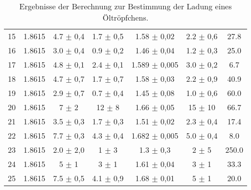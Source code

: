 \begin{landscape}
\begin{table}
\begin{center}
\begin{tabular}{c S[table-format=1.4] S[table-format=1.1] S[table-format=1.2] S[table-format=1.3] S[table-format=1.2] S[table-format=3.1]}
15  & 1.8615  & 4.7 $\pm$ 0,4  & 1.7  $\pm$ 0,5  & 1.58   $\pm$ 0,02  &  2.2 $\pm$   0,6  &   27.8\\
16  & 1.8615  & 3.0 $\pm$ 0,4  & 0.9  $\pm$ 0,2  & 1.46   $\pm$ 0,04  &  1.2 $\pm$   0,3  &   25.0\\
17  & 1.8615  & 4.8 $\pm$ 0,1  & 2.4  $\pm$ 0,1  & 1.589  $\pm$ 0,005 &  3.0 $\pm$   0,2  &    6.7\\
18  & 1.8615  & 4.7 $\pm$ 0,7  & 1.7  $\pm$ 0,7  & 1.58   $\pm$ 0,03  &  2.2 $\pm$   0,9  &   40.9\\
19  & 1.8615  & 2.9 $\pm$ 0,7  & 0.7  $\pm$ 0,4  & 1.45   $\pm$ 0,08  &  1.0 $\pm$   0,6  &   60.0\\
20  & 1.8615  & 7   $\pm$ 2    & 12   $\pm$ 8    & 1.66   $\pm$ 0,05  & 15   $\pm$ 10     &   66.7\\
21  & 1.8615  & 3.5 $\pm$ 0,3  & 1.7  $\pm$ 0,3  & 1.51   $\pm$ 0,02  &  2.3 $\pm$   0,4  &   17.4\\
22  & 1.8615  & 7.7 $\pm$ 0,3  & 4.3  $\pm$ 0,4  & 1.682  $\pm$ 0,005 &  5.0 $\pm$   0,4  &    8.0\\
23  & 1.8615  & 2.0 $\pm$ 2,0  & 1    $\pm$ 3    & 1.3    $\pm$ 0,3   &  2   $\pm$   5    &  250.0\\
24  & 1.8615  & 5   $\pm$ 1    & 3    $\pm$ 1    & 1.61   $\pm$ 0,04  &  3   $\pm$   1    &   33.3\\
25  & 1.8615  & 7.5 $\pm$ 0,5  & 4.1  $\pm$ 0,9  & 1.68   $\pm$ 0,01  &  5   $\pm$   1    &   20.0\\
		\bottomrule
            \end{tabular}
\caption{Ergebnisse der Berechnung zur Bestimmung der Ladung eines Öltröpfchens.}
        \label{tab:ergebnisse}
  \end{center}
    \end{table}
\end{landscape}
